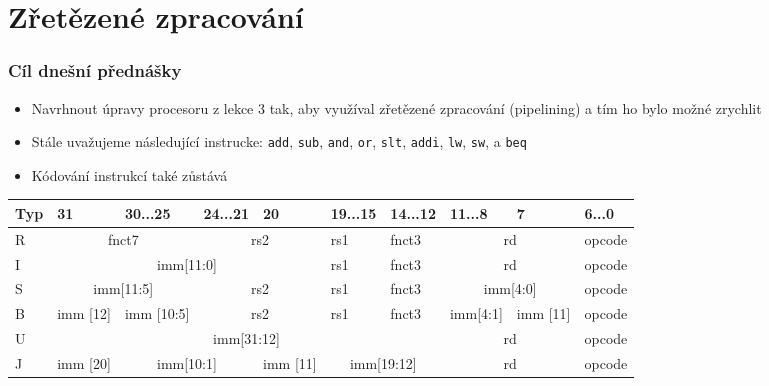 \documentclass{beamer}
\subtitle{Lekce 05. Zřetězené zpracování\\Pipelining}
\author{Pavel Píša \phantom{xxxxxxx} Petr Štěpán \\ \small\texttt{pisa@fel.cvut.cz}\phantom{xxxx}\small\texttt{stepan@fel.cvut.cz}}
\begin{document}
\maketitle

\section{Zřetězené zpracování}

\begin{frame}
\frametitle{Cíl dnešní přednášky}

\begin{itemize}
 \item Navrhnout úpravy procesoru z lekce 3 tak, aby využíval zřetězené zpracování (pipelining) a tím ho bylo možné zrychlit
 \item Stále uvažujeme následující instrucke: \texttt{add}, \texttt{sub}, \texttt{and}, \texttt{or}, \texttt{slt}, \texttt{addi}, \texttt{lw}, \texttt{sw}, a \texttt{beq}
 \item Kódování instrukcí také zůstává
\end{itemize}

\begin{table}
\footnotesize
\begin{tabular}{|m{0.4cm}|m{0.4cm}|m{1.0cm}|m{1.0cm}|m{0.4cm}|m{1.0cm}|m{1.0cm}|m{1.0cm}|m{0.4cm}|m{1.0cm}|}\hline
Typ & 31 & 30...25 & 24...21 & 20 & 19...15 & 14...12 & 11...8 & 7 & 6...0 \\ \hline
R & \multicolumn{2}{c|}{ fnct7 } & \multicolumn{2}{c|}{ rs2 } & rs1 & fnct3 &\multicolumn{2}{c|}{ rd } & opcode\\ \hline
I & \multicolumn{4}{c|}{ imm[11:0] } & rs1 & fnct3 &\multicolumn{2}{c|}{ rd } & opcode\\ \hline
S & \multicolumn{2}{c|}{ imm[11:5] } & \multicolumn{2}{c|}{ rs2 } & rs1 & fnct3 &\multicolumn{2}{c|}{ imm[4:0] } & opcode\\ \hline
B & imm [12] & imm [10:5]  & \multicolumn{2}{c|}{ rs2 } & rs1 & fnct3 & imm[4:1]& imm [11] & opcode\\ \hline
U & \multicolumn{6}{c|}{ imm[31:12] }  & \multicolumn{2}{c|}{ rd } & opcode\\ \hline
J & imm [20] & \multicolumn{2}{c|}{ imm[10:1] } & imm [11] & \multicolumn{2}{c|}{ imm[19:12] } & \multicolumn{2}{c|}{ rd } & opcode\\ \hline
\end{tabular}
\end{table}

\end{frame}
\end{document}
